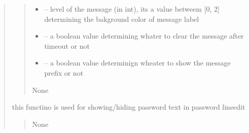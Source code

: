 \documentclass[letterpaper,10pt,english]{sphinxmanual}
\begin{document}
\begin{quote}
\begin{savenotes}
\begin{fulllineitems}
\begin{savenotes}
\begin{fulllineitems}
\begin{quote}
\begin{description}
\begin{itemize}
\item {} 
\sphinxAtStartPar
{} – level of the message (in int), its a value betweem {[}0, 2{]} determining the bakground color of message label

\item {} 
\sphinxAtStartPar
{} – a boolean value determining whater to clear the message after timeout or not

\item {} 
\sphinxAtStartPar
{} – a boolean value determinign wheater to show the message prefix or not

\end{itemize}

\sphinxAtStartPar
None

\end{description}\end{quote}

\end{fulllineitems}\end{savenotes}


\begin{savenotes}\begin{fulllineitems}
\label{\detokenize{setting/login_UI:oxin.login_UI.UI_main_window.showPassword}}
\pysigstartsignatures
{}
\pysigstopsignatures
\sphinxAtStartPar
this functino is used for showing/hiding password text in password lineedit
\begin{quote}\begin{description}
\sphinxAtStartPar
None

\end{description}\end{quote}

\end{fulllineitems}\end{savenotes}


\begin{savenotes}\begin{fulllineitems}
\label{\detokenize{setting/login_UI:oxin.login_UI.UI_main_window.staticMetaObject}}
\pysigstartsignatures
{}
\pysigstopsignatures
\end{fulllineitems}\end{savenotes}



\end{fulllineitems}
\end{savenotes}
\end{quote}
\end{document}
